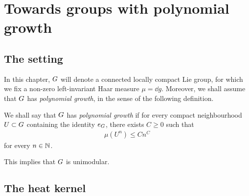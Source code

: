 \chapter{Towards groups with polynomial growth}

\section{The setting}

In this chapter,
$G$ will denote a connected locally compact Lie group,
for which we fix a non-zero left-invariant Haar measure $\mu = \dd g$.
Moreover,
we shall assume that $G$ has \emph{polynomial growth},
in the sense of the following definition.

\begin{definition}
    We shall say that $G$ has \emph{polynomial growth}
    if for every compact neighbourhood $U \subset G$
    containing the identity $e_G$,
    there exists $C \geq 0$ such that
    \begin{align*}
        \mu(U^n) \leq C n^C
    \end{align*}
    for every $n \in \mathbb{N}$.
\end{definition}

This implies that $G$ is unimodular.

\section{The heat kernel}

